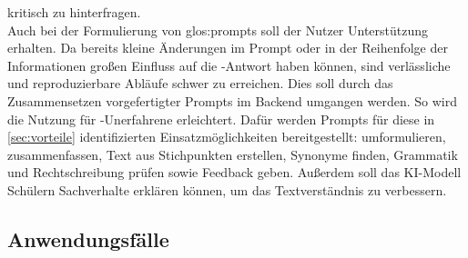 \documentclass[../main.tex]{subfiles}
\begin{document}
kritisch zu hinterfragen.\\
Auch bei der Formulierung von \gls{glos:prompt}s soll der Nutzer Unterstützung erhalten. Da bereits kleine Änderungen im Prompt oder in der Reihenfolge der Informationen großen 
Einfluss auf die -Antwort haben können, sind verlässliche und reproduzierbare Abläufe schwer zu erreichen\cite{creativeWriting}. Dies soll durch das Zusammensetzen vorgefertigter 
Prompts im Backend umgangen werden. So wird die Nutzung für -Unerfahrene erleichtert. Dafür werden Prompts für diese in \autoref{sec:vorteile} identifizierten 
Einsatzmöglichkeiten bereitgestellt: umformulieren, zusammenfassen, Text aus Stichpunkten erstellen, Synonyme finden, Grammatik und Rechtschreibung prüfen sowie Feedback geben. Außerdem soll das KI-Modell
Schülern Sachverhalte erklären können, um das Textverständnis zu verbessern.


\subsection{Anwendungsfälle}
\end{document}
